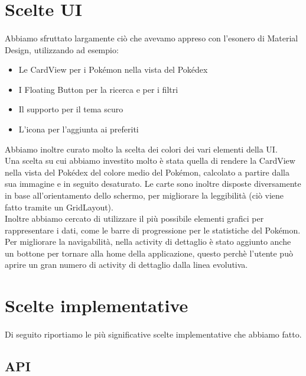 \documentclass[a4paper,11pt]{article}
\begin{document}
	\section{Scelte UI}
		\paragraph{}
			Abbiamo sfruttato largamente ciò che avevamo appreso con l’esonero di Material Design, utilizzando ad esempio:
			\begin{itemize}
				\item Le CardView per i Pokémon nella vista del Pokédex
				\item I Floating Button per la ricerca e per i filtri
				\item Il supporto per il tema scuro
				\item L’icona per l’aggiunta ai preferiti
			\end{itemize} 
			Abbiamo inoltre curato molto la scelta dei colori dei vari elementi della UI.\\
			Una scelta su cui abbiamo investito molto è stata quella di rendere la CardView nella vista del Pokédex del colore medio del Pokémon, calcolato a partire dalla sua immagine e in seguito desaturato. Le carte sono inoltre disposte diversamente in base all’orientamento dello schermo, per migliorare la leggibilità (ciò viene fatto tramite un GridLayout).\\
			Inoltre abbiamo cercato di utilizzare il più possibile elementi grafici per rappresentare i dati, come le barre di progressione per le statistiche del Pokémon.\\
			Per migliorare la navigabilità, nella activity di dettaglio è stato aggiunto anche un bottone per tornare alla home della applicazione, questo perchè l’utente può aprire un gran numero di activity di dettaglio dalla linea evolutiva. \newpage
 
  	\section{Scelte implementative}
  		\paragraph{}
  			Di seguito riportiamo le più significative scelte implementative che abbiamo fatto.
  				\subsection{API}
\end{document}
